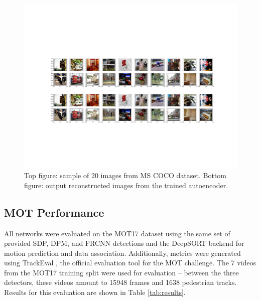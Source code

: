 \documentclass[10pt,twocolumn,letterpaper]{article}
\begin{document}
\begin{figure}[h!]
    \centering
    \includegraphics[width=1.\linewidth]{docs/reports/figs/reconstruction_original.pdf}
    \caption{Top figure: sample of 20 images from MS COCO dataset. Bottom figure: output reconstructed images from the trained autoencoder.}
    \label{fig:ae_reconstruction}
\end{figure}


\subsection{MOT Performance}
All networks were evaluated on the MOT17 dataset \cite{MOT17} using the same set of provided SDP, DPM, and FRCNN detections and the DeepSORT backend \cite{Wojke2018} for motion prediction and data association. Additionally, metrics were generated using TrackEval \cite{luiten2020IJCV}, the official evaluation tool for the MOT challenge. The 7 videos from the MOT17 training split were used for evaluation -- between the three detectors, these videos amount to 15948 frames and 1638 pedestrian tracks. Results for this evaluation are shown in Table \ref{tab:results}.
\end{document}
